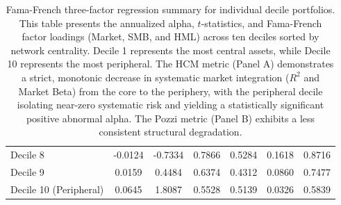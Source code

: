 \documentclass[fleqn]{rbfin}
\begin{document}
\begin{table}[!htbp]
{\begin{tabular}{lcccccc}
    Decile 8 & -0.0124 & -0.7334 & 0.7866 & 0.5284 & 0.1618 & 0.8716 \\
    Decile 9 & 0.0159 & 0.4484 & 0.6374 & 0.4312 & 0.0860 & 0.7477 \\
    Decile 10 (Peripheral) & 0.0645 & 1.8087 & 0.5528 & 0.5139 & 0.0326 & 0.5839 \\
    \bottomrule
    \end{tabular}%
    }
    \vspace{0.2cm}
        \caption{Fama-French three-factor regression summary for individual decile portfolios. This table presents the annualized alpha, $t$-statistics, and Fama-French factor loadings (Market, SMB, and HML) across ten deciles sorted by network centrality. Decile 1 represents the most central assets, while Decile 10 represents the most peripheral. The HCM metric (Panel A) demonstrates a strict, monotonic decrease in systematic market integration ($R^2$ and Market Beta) from the core to the periphery, with the peripheral decile isolating near-zero systematic risk and yielding a statistically significant positive abnormal alpha. The Pozzi metric (Panel B) exhibits a less consistent structural degradation.}
    \label{tab:fmb_single}
\end{table}
\end{document}
